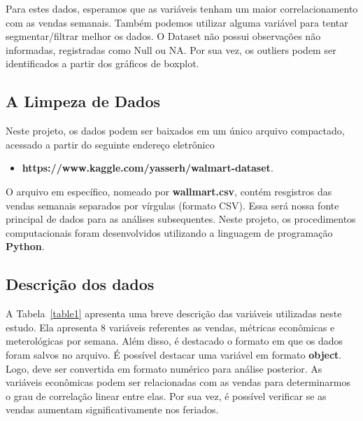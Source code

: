 \documentclass[letterpaper,11pt]{article}
\begin{document}
Para estes dados, esperamos que as variáveis tenham um maior correlacionamento com as vendas semanais. Também podemos utilizar alguma variável para tentar segmentar/filtrar melhor os dados. O Dataset não possui observações não informadas, registradas como Null ou NA. Por sua vez, os outliers podem ser identificados a partir dos gráficos de boxplot.

\subsection{A Limpeza de Dados}

Neste projeto, os dados podem ser baixados em um único arquivo compactado, acessado a partir do seguinte endereço eletrônico 
\begin{itemize}
    \item  \textbf{https://www.kaggle.com/yasserh/walmart-dataset}.
\end{itemize}

O arquivo em específico, nomeado por \textbf{wallmart.csv}, contém resgistros das vendas semanais separados por vírgulas (formato CSV). Essa será nossa fonte principal de dados para as análises subsequentes. Neste projeto, os procedimentos computacionais foram desenvolvidos utilizando a linguagem de programação \textbf{Python}.

\subsection{Descrição dos dados}

A Tabela~\ref{table1} apresenta uma breve descrição das variáveis utilizadas neste estudo. Ela apresenta 8 variáveis referentes as vendas, métricas econômicas e meterológicas por semana. Além disso, é destacado o formato em que os dados foram salvos no arquivo. É possível destacar uma variável em formato \textbf{object}. Logo, deve ser convertida em formato numérico para análise posterior.  As variáveis econômicas podem ser relacionadas com as vendas para determinarmos o grau de correlação linear entre elas. Por sua vez, é possível verificar se as vendas aumentam significativamente nos feriados.
\end{document}
